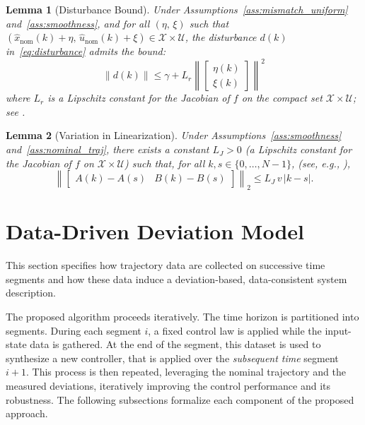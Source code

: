 \documentclass[letterpaper, 10 pt, conference]{ieeeconf}
\newtheorem{lemma}{Lemma}
\begin{document}
\begin{lemma}[Disturbance Bound]\label{lem:disturbance_bound}
Under Assumptions~\ref{ass:mismatch_uniform} and~\ref{ass:smoothness}, and for all $(\eta,\, \xi)$ such that $(\hat{x}_{\text{nom}}(k)+\eta,\, \hat{u}_{\text{nom}}(k)+\xi) \in \mathcal{X}\times \mathcal{U}$, the disturbance $d(k)$ in~\eqref{eq:disturbance} admits the bound:
\begin{equation}\label{eq:dk_state_dep}
\|d(k)\| \le \gamma + L_r \left\|\begin{bmatrix}\eta(k)\\ \xi(k)\end{bmatrix}\right\|^2
\end{equation}
where $L_r$ is a Lipschitz constant for the Jacobian of $f$ on the compact set $\mathcal{X}\times \mathcal{U}$; see \cite{Nesterov2004}.
\end{lemma}

\begin{lemma}[Variation in Linearization]\label{lem:AB_var}
Under Assumptions~\ref{ass:smoothness} and~\ref{ass:nominal_traj}, there exists a constant \(L_J > 0\) (a Lipschitz constant for the Jacobian of \(f\) on $\mathcal{X}\times \mathcal{U}$) such that, for all \(k, s \in \{0, \dots, N-1\}\), (see, e.g., \cite{NesterovPolyak2006}),
\[
\left\| \begin{bmatrix} A(k)-A(s) & B(k)-B(s) \end{bmatrix} \right\|_2 \le L_J \, v \, |k-s|.
\]
\end{lemma}


\section{Data-Driven Deviation Model}
\label{sec:data_driven_synthesis}

This section specifies how trajectory data are collected on successive time segments and how these data induce a deviation-based, data-consistent system description.

The proposed algorithm proceeds iteratively. The time horizon is partitioned into segments. During each segment $i$, a fixed control law is applied while the input-state data is gathered. At the end of the segment, this dataset is used to synthesize a new controller, that is applied over the {\em subsequent time} segment $i+1$. This process is then repeated, leveraging the nominal trajectory and the measured deviations, iteratively improving the control performance and its robustness. The following subsections formalize each component of the proposed approach.
\end{document}
